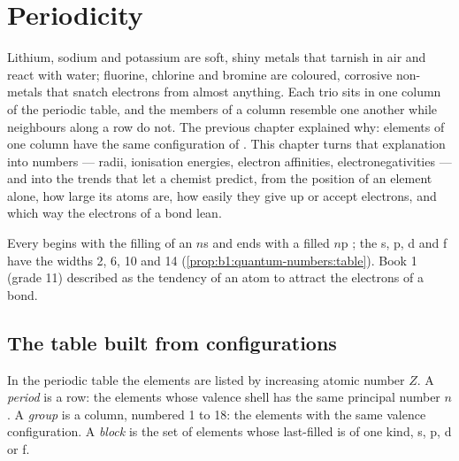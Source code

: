 \chapter{Periodicity}\label{ch:b1:periodicity}

Lithium, sodium and potassium are soft, shiny metals that tarnish in air
and react with water; fluorine, chlorine and bromine are coloured,
corrosive non-metals that snatch electrons from almost anything. Each
trio sits in one column of the periodic table, and the members of a
column resemble one another while neighbours along a row do not. The
previous chapter explained why: elements of one column have the same
configuration of . This chapter turns that explanation
into numbers --- radii, ionisation energies, electron affinities,
electronegativities --- and into the trends that let a chemist predict,
from the position of an element alone, how large its atoms are, how
easily they give up or accept electrons, and which way the electrons of
a bond lean.

\begin{recall}
Every  begins with the filling of an $n$s  and ends with a
filled $n$p ; the s, p, d and f  have the widths 2, 6, 10
and 14 (\cref{prop:b1:quantum-numbers:table}). Book 1 (grade 11)
described  as the tendency of an atom to attract the
electrons of a bond.
\end{recall}

\section{The table built from configurations}

\begin{definition}\label{def:b1:periodicity:table}
In the periodic table the elements are listed by increasing atomic
number $Z$. A \emph{period} is a row: the elements whose
valence shell has the same principal number $n$. A
\emph{group} is a column, numbered 1 to 18: the elements
with the same valence configuration. A \emph{block} is the
set of elements whose last-filled  is of one kind, s, p, d or f.
\end{definition}

